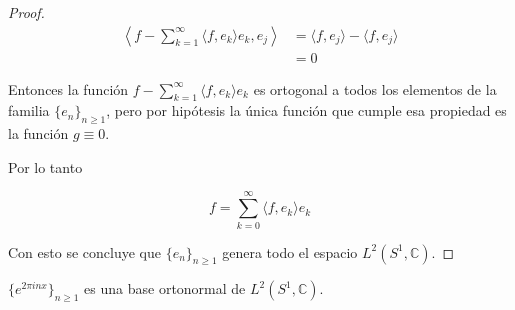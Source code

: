 \begin{proof}
	\begin{align}
		\left\langle f - \sum_{k=1}^{\infty} \langle f,e_k \rangle e_k,e_j \right\rangle &= \langle f,e_j \rangle - \langle f,e_j \rangle\\
		&= 0
	\end{align}
	
	Entonces la función $f - \sum_{k=1}^{\infty} \langle f,e_k \rangle e_k$ es ortogonal a todos los elementos de la familia $\{e_n\}_{n \geq 1}$, pero por hipótesis la única función que cumple esa propiedad es la función $g \equiv 0$.
	
	Por lo tanto
	
	\begin{equation}
		f = \sum_{k=0}^{\infty} \langle f,e_k \rangle e_k
	\end{equation}
	
	Con esto se concluye que $\{e_n\}_{n \geq 1}$ genera todo el espacio $L^2(S^1,\mathbb{C})$.
\end{proof}

\begin{teorema}
	$\{e^{2\pi inx}\}_{n \geq 1}$ es una base ortonormal de $L^2(S^1,\mathbb{C})$.
\end{teorema}


